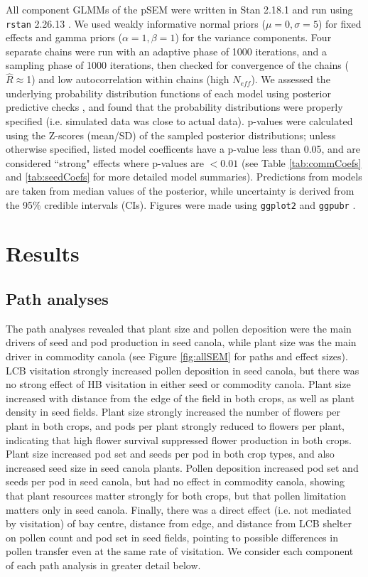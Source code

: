 \documentclass[12pt]{article} %
\begin{document}
All component GLMMs of the pSEM were written in Stan 2.18.1 and run using \texttt{rstan} 2.26.13 \citep{gelman2015, Rstan}.
We used weakly informative normal priors ($\mu=0, \sigma=5$) for fixed effects and gamma priors ($\alpha=1, \beta=1$) for the variance components.
Four separate chains were run with an adaptive phase of 1000 iterations, and a sampling phase of 1000 iterations, then checked for convergence of the chains ($\hat{R} \approx$1) and low autocorrelation within chains (high $N_{eff}$).
We assessed the underlying probability distribution functions of each model using posterior predictive checks \citep{gelman2013}, and found that the probability distributions were properly specified (i.e. simulated data was close to actual data).
p-values were calculated using the Z-scores (mean/SD) of the sampled posterior distributions; unless otherwise specified, listed model coefficents have a p-value less than 0.05, and are considered ``strong" effects where p-values are $<0.01$ (see Table \ref{tab:commCoefs} and \ref{tab:seedCoefs} for more detailed model summaries). 
Predictions from models are taken from median values of the posterior, while uncertainty is derived from the 95\% credible intervals (CIs).
Figures were made using \texttt{ggplot2} and \texttt{ggpubr} \citep{wickham2016, kassambara2020}.

\section*{Results}

\subsection*{Path analyses}
The path analyses revealed that plant size and pollen deposition were the main drivers of seed and pod production in seed canola, while plant size was the main driver in commodity canola (see Figure \ref{fig:allSEM} for paths and effect sizes). 
LCB visitation strongly increased pollen deposition in seed canola, but there was no strong effect of HB visitation in either seed or commodity canola.
Plant size increased with distance from the edge of the field in both crops, as well as plant density in seed fields.
Plant size strongly increased the number of flowers per plant in both crops, and pods per plant strongly reduced to flowers per plant, indicating that high flower survival suppressed flower production in both crops.
Plant size increased pod set and seeds per pod in both crop types, and also increased seed size in seed canola plants.
Pollen deposition increased pod set and seeds per pod in seed canola, but had no effect in commodity canola, showing that plant resources matter strongly for both crops, but that pollen limitation matters only in seed canola.
Finally, there was a direct effect (i.e. not mediated by visitation) of bay centre, distance from edge, and distance from LCB shelter on pollen count and pod set in seed fields, pointing to possible differences in pollen transfer even at the same rate of visitation. 
We consider each component of each path analysis in greater detail below.
\end{document}
